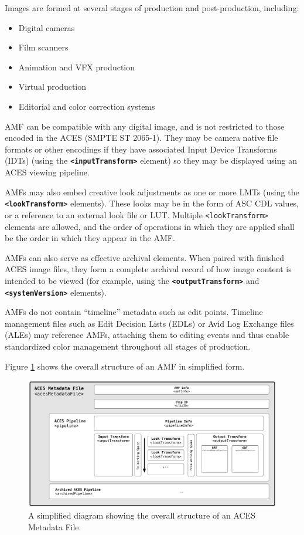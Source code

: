 Images are formed at several stages of production and post-production, including:

\begin{itemize}
    \item Digital cameras
    \item Film scanners 
    \item Animation and VFX production
    \item Virtual production
    \item Editorial and color correction systems
\end{itemize}

AMF can be compatible with any digital image, and is not restricted to those encoded in the ACES (SMPTE ST 2065-1). They may be camera native file formats or other encodings if they have associated Input Device Transforms (IDTs) (using the \texttt{\textbf{<inputTransform>}} element) so they may be displayed using an ACES viewing pipeline.

AMFs may also embed creative look adjustments as one or more LMTs (using the \texttt{\textbf{<lookTransform>}} elements). These looks may be in the form of ASC CDL values, or a reference to an external look file or LUT.  Multiple \texttt{<lookTransform>} elements are allowed, and the order of operations in which they are applied shall be the order in which they appear in the AMF.

AMFs can also serve as effective archival elements. When paired with finished ACES image files, they form a complete archival record of how image content is intended to be viewed (for example, using the \texttt{\textbf{<outputTransform>}} and \texttt{\textbf{<systemVersion>}} elements).

AMFs do not contain ``timeline'' metadata such as edit points. Timeline management files such as Edit Decision Lists (EDLs) or Avid Log Exchange files (ALEs) may reference AMFs, attaching them to editing events and thus enable standardized color management throughout all stages of production.

Figure \ref{fig:overviewDiagram} shows the overall structure of an AMF in simplified form.

\begin{figure}[h]
    \includegraphics[width=\textwidth]{./images/amfDiagram.pdf}
    \caption{A simplified diagram showing the overall structure of an ACES Metadata File.}
    \label{fig:overviewDiagram}
    \centering
\end{figure}

